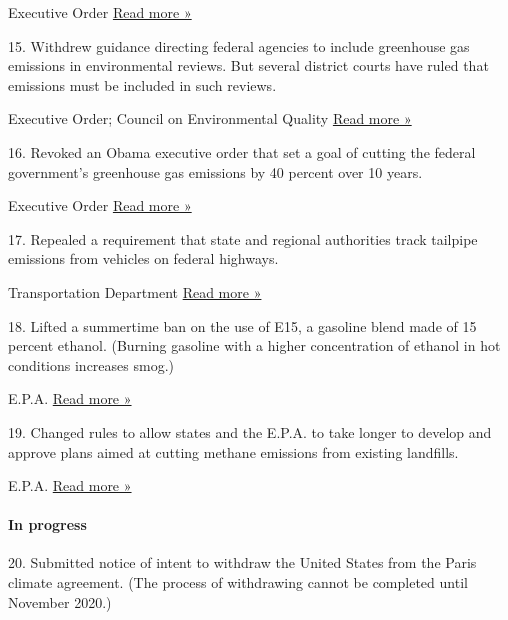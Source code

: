  Executive Order \textbar{}
\href{http://www.sciencemag.org/news/2017/08/trump-s-attack-social-cost-carbon-could-end-hurting-his-fossil-fuel-push}{Read
more »}

15. Withdrew guidance directing federal agencies to include greenhouse
gas emissions in environmental reviews. But several district courts have
ruled that emissions must be included in such reviews.

 Executive Order; Council on Environmental Quality \textbar{}
\href{https://www.eenews.net/greenwire/stories/1060052285}{Read more »}

16. Revoked an Obama executive order that set a goal of cutting the
federal government's greenhouse gas emissions by 40 percent over 10
years.

 Executive Order \textbar{}
\href{http://columbiaclimatelaw.com/climate-deregulation-tracker/president-issues-executive-order-revoking-federal-sustainability-plan/}{Read
more »}

17. Repealed a requirement that state and regional authorities track
tailpipe emissions from vehicles on federal highways.

 Transportation Department \textbar{}
\href{https://usa.streetsblog.org/2018/05/31/trump-admin-snuffs-out-climate-progress-at-u-s-dot/}{Read
more »}

18. Lifted a summertime ban on the use of E15, a gasoline blend made of
15 percent ethanol. (Burning gasoline with a higher concentration of
ethanol in hot conditions increases smog.)

 E.P.A. \textbar{}
\href{https://www.nytimes3xbfgragh.onion/2019/05/31/climate/trump-ethanol-fuel-ban.html}{Read
more »}

19. Changed rules to allow states and the E.P.A. to take longer to
develop and approve plans aimed at cutting methane emissions from
existing landfills.

 E.P.A. \textbar{}
\href{https://eelp.law.harvard.edu/2017/09/municipal-solid-waste-landfill-new-source-performance-standards-and-emissions-guidelines/}{Read
more »}

\hypertarget{in-progress}{%
\paragraph{In progress}\label{in-progress}}

20. Submitted notice of intent to withdraw the United States from the
Paris climate agreement. (The process of withdrawing cannot be completed
until November 2020.)

